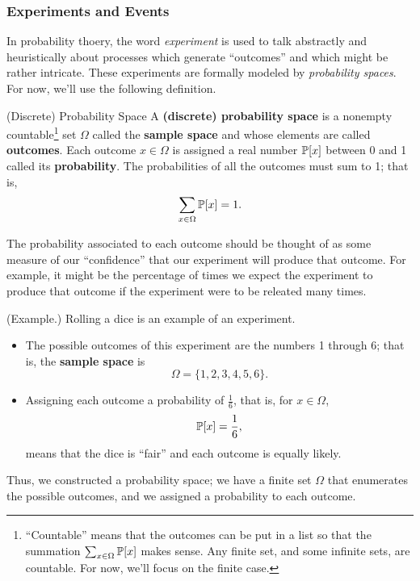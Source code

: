\documentclass[letterpaper]{article}
\begin{document}
\subsubsection{Experiments and Events}
In probability thoery, the word \emph{experiment} is used to talk abstractly and heuristically about processes which generate ``outcomes'' and which might be rather intricate. These experiments are formally modeled by \emph{probability spaces}. For now, we'll use the following definition. 
\begin{definition}{(Discrete) Probability Space}{}
    A \textbf{(discrete) probability space} is a nonempty countable\footnote{``Countable'' means that the outcomes can be put in a list so that the summation $\sum_{x \in \Omega} \mathbb{P}[x]$ makes sense. Any finite set, and some infinite sets, are countable. For now, we'll focus on the finite case.} set $\Omega$ called the \textbf{sample space} and whose elements are called \textbf{outcomes}. Each outcome $x \in \Omega$ is assigned a real number $\mathbb{P}[x]$ between 0 and 1 called its \textbf{probability}. The probabilities of all the outcomes must sum to 1; that is, 
    \[\sum_{x \in \Omega} \mathbb{P}[x] = 1.\]
\end{definition}
The probability associated to each outcome should be thought of as some measure of our ``confidence'' that our experiment will produce that outcome. For example, it might be the percentage of times we expect the experiment to produce that outcome if the experiment were to be releated many times. 

\begin{mdframed}
    (Example.) Rolling a dice is an example of an experiment. 
    \begin{itemize}
        \item The possible outcomes of this experiment are the numbers 1 through 6; that is, the \textbf{sample space} is \[\Omega = \{1, 2, 3, 4, 5, 6\}.\] 
        \item Assigning each outcome a probability of $\frac{1}{6}$, that is, for $x \in \Omega$, \[\mathbb{P}[x] = \frac{1}{6},\] means that the dice is ``fair'' and each outcome is equally likely. 
    \end{itemize}
    Thus, we constructed a probability space; we have a finite set $\Omega$ that enumerates the possible outcomes, and we assigned a probability to each outcome. 
\end{mdframed}
\end{document}
